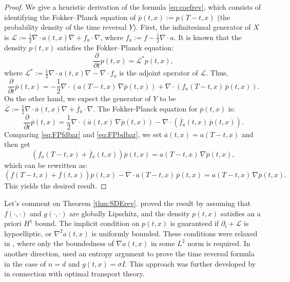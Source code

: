 \documentclass[letterpaper,11pt,reqno]{amsart}
\numberwithin{equation}{section}
\begin{document}
\begin{proof}
We give a heuristic derivation of the formula \eqref{eq:coefrev},
which consists of identifying the Fokker–Planck equation of 
$\overline{p}(t,x) := p(T-t, x)$ (the probability density of the time reversal $Y$).
First, the infinitesimal generator of $X$ is 
$\mathcal{L}:= \frac{1}{2} \nabla \cdot a(t,x) \nabla +f_a \cdot \nabla$,
where $f_a:= f - \frac{1}{2} \nabla \cdot a$.
It is known that the density $p(t,x)$ satisfies the Fokker–Planck equation:
\begin{equation*}
\frac{\partial}{\partial t} p(t,x) = \mathcal{L}^*p(t,x),
\end{equation*}
where $\mathcal{L}^*:= \frac{1}{2} \nabla \cdot a(t,x) \nabla - \nabla \cdot f_a$ is the adjoint operator of $\mathcal{L}$.
Thus,
\begin{equation}
\label{eq:FPfdbar}
\frac{\partial}{\partial t} \overline{p}(t,x) = -\frac{1}{2} \nabla \cdot \left(a(T-t, x) \, \nabla \overline{p}(t,x) \right) + \nabla \cdot \left(f_a(T-t, x) \, \overline{p}(t,x) \right).
\end{equation}
On the other hand, we expect the generator of $Y$ to be 
$\overline{\mathcal{L}}:=  \frac{1}{2} \nabla \cdot \overline{a}(t,x) \nabla + \overline{f}_{\overline{a}} \cdot \nabla$.
The Fokker-Planck equation for $\overline{p}(t,x)$ is:
\begin{equation}
\label{eq:FPbdbar}
\frac{\partial}{\partial t} \overline{p}(t,x) = \frac{1}{2} \nabla \cdot \left(\overline{a}(t, x) \, \nabla \overline{p}(t,x) \right) - \nabla \cdot \left(\overline{f}_{\overline{a}}(t, x) \, \overline{p}(t,x) \right).
\end{equation}
Comparing \eqref{eq:FPfdbar} and \eqref{eq:FPbdbar},
we set $\overline{a}(t,x) = a(T-t, x)$ and then get
\begin{equation*}
\left(f_a(T-t,x) + \overline{f}_{\overline{a}}(t,x)\right) \overline{p}(t,x) = a(T-t,x) \, \nabla \overline{p}(t,x),
\end{equation*}
which can be rewritten as:
\begin{equation*}
\left(f(T-t,x) + \overline{f}(t,x)\right) \overline{p}(t,x)- \nabla \cdot a(T-t, x) \, \overline{p}(t,x) = a(T-t,x) \, \nabla \overline{p}(t,x).
\end{equation*}
This yields the desired result. 
\end{proof}

\quad Let's comment on Theorem \ref{thm:SDErev}.
\cite{HP86, MNS89} proved the result by assuming that $f(\cdot, \cdot)$ and $g(\cdot, \cdot)$ are globally Lipschitz, and 
the density $p(t,x)$ satisfies an a priori $H^1$ bound. 
The implicit condition on $p(t,x)$ is guaranteed if $\partial_t + \mathcal{L}$ is hypoelliptic, or $\nabla^2 a(t,x)$ is uniformly bounded.
These conditions were relaxed in \cite{Quastel02}, where only the boundedness of $\nabla a(t,x)$ in some $L^2$ norm is required. 
In another direction, \cite{Fo85, Fo86} used an entropy argument to prove the time reversal formula in the case of $n =d$ and $g(t,x) = \sigma I$. 
This approach was further developed by \cite{CCGL21} in connection with optimal transport theory. 
\end{document}
